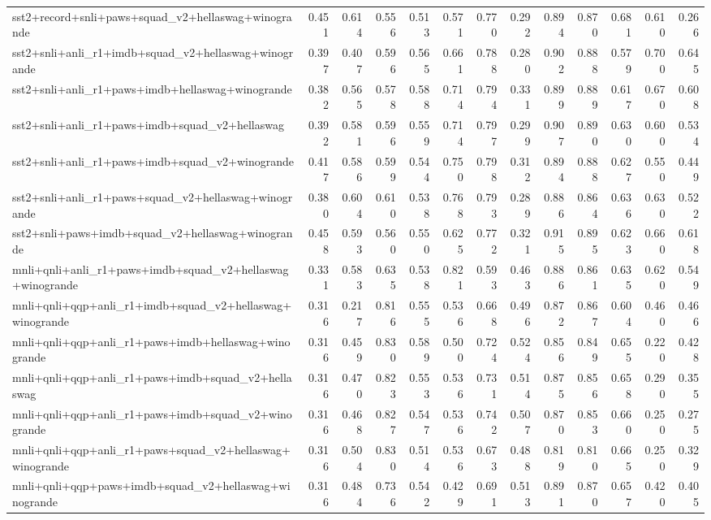 \begin{table}[t]
\begin{tabular}{lrrrrrrrrrrrr}
    sst2+record+snli+paws+squad\_v2+hellaswag+winogrande & 0.451 & 0.614 & 0.556 & 0.513 & 0.571 & 0.770 & 0.292 & 0.894 & 0.870 & 0.681 & 0.610 & 0.266 \\
    sst2+snli+anli\_r1+imdb+squad\_v2+hellaswag+winogrande & 0.397 & 0.407 & 0.596 & 0.565 & 0.661 & 0.788 & 0.280 & 0.902 & 0.888 & 0.579 & 0.700 & 0.645 \\
    sst2+snli+anli\_r1+paws+imdb+hellaswag+winogrande & 0.382 & 0.565 & 0.578 & 0.588 & 0.714 & 0.794 & 0.331 & 0.899 & 0.889 & 0.617 & 0.670 & 0.608 \\
    sst2+snli+anli\_r1+paws+imdb+squad\_v2+hellaswag & 0.392 & 0.581 & 0.596 & 0.559 & 0.714 & 0.797 & 0.299 & 0.907 & 0.890 & 0.630 & 0.600 & 0.534 \\
    sst2+snli+anli\_r1+paws+imdb+squad\_v2+winogrande & 0.417 & 0.586 & 0.599 & 0.544 & 0.750 & 0.798 & 0.312 & 0.894 & 0.888 & 0.627 & 0.550 & 0.449 \\
    sst2+snli+anli\_r1+paws+squad\_v2+hellaswag+winogrande & 0.380 & 0.604 & 0.610 & 0.538 & 0.768 & 0.793 & 0.289 & 0.886 & 0.864 & 0.636 & 0.630 & 0.522 \\
    sst2+snli+paws+imdb+squad\_v2+hellaswag+winogrande & 0.458 & 0.593 & 0.560 & 0.550 & 0.625 & 0.772 & 0.321 & 0.915 & 0.895 & 0.623 & 0.660 & 0.618 \\
    \addlinespace
    mnli+qnli+anli\_r1+paws+imdb+squad\_v2+hellaswag+winogrande & 0.331 & 0.583 & 0.635 & 0.538 & 0.821 & 0.593 & 0.463 & 0.886 & 0.861 & 0.635 & 0.620 & 0.549 \\
    mnli+qnli+qqp+anli\_r1+imdb+squad\_v2+hellaswag+winogrande & 0.316 & 0.217 & 0.816 & 0.555 & 0.536 & 0.668 & 0.496 & 0.872 & 0.867 & 0.604 & 0.460 & 0.466 \\
    mnli+qnli+qqp+anli\_r1+paws+imdb+hellaswag+winogrande & 0.316 & 0.459 & 0.830 & 0.589 & 0.500 & 0.724 & 0.524 & 0.856 & 0.849 & 0.655 & 0.220 & 0.428 \\
    mnli+qnli+qqp+anli\_r1+paws+imdb+squad\_v2+hellaswag & 0.316 & 0.470 & 0.823 & 0.553 & 0.536 & 0.731 & 0.514 & 0.875 & 0.856 & 0.658 & 0.290 & 0.355 \\
    mnli+qnli+qqp+anli\_r1+paws+imdb+squad\_v2+winogrande & 0.316 & 0.468 & 0.827 & 0.547 & 0.536 & 0.742 & 0.507 & 0.870 & 0.853 & 0.660 & 0.250 & 0.275 \\
    mnli+qnli+qqp+anli\_r1+paws+squad\_v2+hellaswag+winogrande & 0.316 & 0.504 & 0.830 & 0.514 & 0.536 & 0.673 & 0.488 & 0.819 & 0.810 & 0.665 & 0.250 & 0.329 \\
    mnli+qnli+qqp+paws+imdb+squad\_v2+hellaswag+winogrande & 0.316 & 0.484 & 0.736 & 0.542 & 0.429 & 0.691 & 0.513 & 0.891 & 0.870 & 0.657 & 0.420 & 0.405 \\

\end{tabular}
\end{table}
